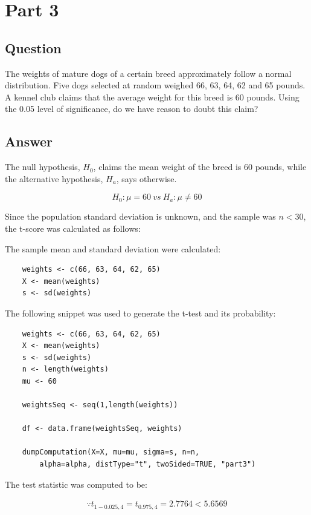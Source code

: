 \section{Part 3}
    \subsection{Question}
    The weights of mature dogs of a certain breed approximately follow a normal distribution. Five dogs selected at random weighed 66, 63, 64, 62 and 65 pounds. A kennel club claims that the average weight for this breed is 60 pounds. Using the 0.05 level of significance, do we have reason to doubt this claim?

    \subsection{Answer}
    The null hypothesis, $H_{0}$, claims the mean weight of the breed is 60 pounds, while the alternative hypothesis, $H_{a}$, says otherwise.

        \[ H_{0}: \mu = 60 \ vs \ H_{a}: \mu \neq 60 \]

    Since the population standard deviation is unknown, and the sample was $n < 30$, the t-score was calculated as follows:

    The sample mean and standard deviation were calculated:
\begin{lstlisting}
    weights <- c(66, 63, 64, 62, 65)
    X <- mean(weights)
    s <- sd(weights)
\end{lstlisting}

        


    The following snippet was used to generate the t-test and its probability:
\begin{lstlisting}
    weights <- c(66, 63, 64, 62, 65)
    X <- mean(weights)
    s <- sd(weights)
    n <- length(weights)
    mu <- 60

    weightsSeq <- seq(1,length(weights))

    df <- data.frame(weightsSeq, weights)

    dumpComputation(X=X, mu=mu, sigma=s, n=n, 
        alpha=alpha, distType="t", twoSided=TRUE, "part3")
\end{lstlisting}

    The test statistic was computed to be:

        \begin{align*}
            \because t_{1-0.025,4}=t_{0.975,4}=2.7764 < 5.6569\\
        \end{align*}

